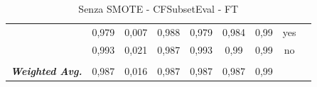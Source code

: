\begin{table}[htbp]
{\begin{tabular}{rrrrrrrrr}
			\multicolumn{1}{c}{} & \multicolumn{1}{c}{0,979} & \multicolumn{1}{c}{0,007} & \multicolumn{1}{c}{0,988} & \multicolumn{1}{c}{0,979} & \multicolumn{1}{c}{0,984} & \multicolumn{1}{c}{0,99} & \multicolumn{1}{c}{yes} &  \\
			\multicolumn{1}{c}{} & \multicolumn{1}{c}{0,993} & \multicolumn{1}{c}{0,021} & \multicolumn{1}{c}{0,987} & \multicolumn{1}{c}{0,993} & \multicolumn{1}{c}{0,99} & \multicolumn{1}{c}{0,99} & \multicolumn{1}{c}{no} &  \\
			\multicolumn{1}{c}{} & \multicolumn{1}{c}{} & \multicolumn{1}{c}{} & \multicolumn{1}{c}{} & \multicolumn{1}{c}{} & \multicolumn{1}{c}{} & \multicolumn{1}{c}{} & \multicolumn{1}{c}{} &  \\
			\multicolumn{1}{c}{\textit{\textbf{Weighted Avg.}}} & \multicolumn{1}{c}{0,987} & \multicolumn{1}{c}{0,016} & \multicolumn{1}{c}{0,987} & \multicolumn{1}{c}{0,987} & \multicolumn{1}{c}{0,987} & \multicolumn{1}{c}{0,99} & \multicolumn{1}{c}{} &  \\
		\end{tabular}%
	}
	\label{tab:FTFiltered}%
	\caption{ Senza SMOTE - CFSubsetEval - FT}
\end{table}%

